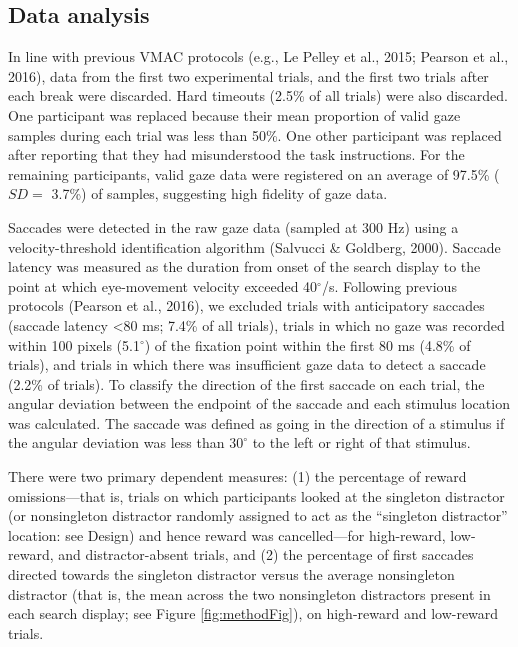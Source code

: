 \documentclass[man, a4paper, noextraspace, 11pt,floatsintext]{apa6}
\begin{document}
\subsection{Data analysis}\label{data-analysis}

In line with previous VMAC protocols (e.g., Le Pelley et al., 2015;
Pearson et al., 2016), data from the first two experimental trials, and
the first two trials after each break were discarded. Hard timeouts
(2.5\% of all trials) were also discarded. One participant was replaced
because their mean proportion of valid gaze samples during each trial
was less than 50\%. One other participant was replaced after reporting
that they had misunderstood the task instructions. For the remaining
participants, valid gaze data were registered on an average of 97.5\%
(\(SD=\) 3.7\%) of samples, suggesting high fidelity of gaze data.

Saccades were detected in the raw gaze data (sampled at 300 Hz) using a
velocity-threshold identification algorithm (Salvucci \& Goldberg,
2000). Saccade latency was measured as the duration from onset of the
search display to the point at which eye-movement velocity exceeded
40\(^\circ\)/s. Following previous protocols (Pearson et al., 2016), we
excluded trials with anticipatory saccades (saccade latency
\textless{}80 ms; 7.4\% of all trials), trials in which no gaze was
recorded within 100 pixels (5.1\(^\circ\)) of the fixation point within
the first 80 ms (4.8\% of trials), and trials in which there was
insufficient gaze data to detect a saccade (2.2\% of trials). To
classify the direction of the first saccade on each trial, the angular
deviation between the endpoint of the saccade and each stimulus location
was calculated. The saccade was defined as going in the direction of a
stimulus if the angular deviation was less than \(30^\circ\) to the left
or right of that stimulus.

There were two primary dependent measures: (1) the percentage of reward
omissions---that is, trials on which participants looked at the
singleton distractor (or nonsingleton distractor randomly assigned to
act as the \enquote{singleton distractor} location: see Design) and
hence reward was cancelled---for high-reward, low-reward, and
distractor-absent trials, and (2) the percentage of first saccades
directed towards the singleton distractor versus the average
nonsingleton distractor (that is, the mean across the two nonsingleton
distractors present in each search display; see Figure
\ref{fig:methodFig}), on high-reward and low-reward trials.
\end{document}
